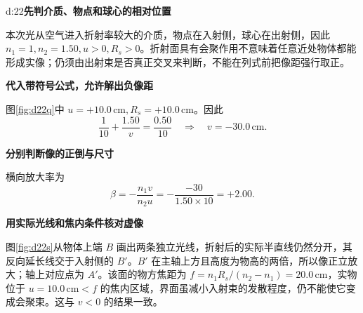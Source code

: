 \begin{drillsolution}{d:22}\textbf{先判介质、物点和球心的相对位置}\par\nobreak
本次光从空气进入折射率较大的介质，物点在入射侧，球心在出射侧，因此 $n_1=1,n_2=1.50,u>0,R_s>0$。折射面具有会聚作用不意味着任意近处物体都能形成实像；仍须由出射束是否真正交叉来判断，不能在列式前把像距强行取正。



\par\medskip{}\noindent\textbf{代入带符号公式，允许解出负像距}\par\nobreak
图\ref{fig:d22q}中 \(u=+10.0\,\mathrm{cm},R_s=+10.0\,\mathrm{cm}\)。因此
\[
 \frac1{10}+\frac{1.50}{v}=\frac{0.50}{10}
 \quad\Rightarrow\quad\boxed{v=-30.0\,\mathrm{cm}}.
\]


\par\medskip{}\noindent\textbf{分别判断像的正倒与尺寸}\par\nobreak
横向放大率为
\[
 \boxed{\beta=-\frac{n_1v}{n_2u}
 =-\frac{-30}{1.50\times10}=+2.00}.
\]


\par\medskip{}\noindent\textbf{用实际光线和焦内条件核对虚像}\par\nobreak
图\ref{fig:d22s}从物体上端 $B$ 画出两条独立光线，折射后的实际半直线仍然分开，其反向延长线交于入射侧的 $B'$。$B'$ 在主轴上方且高度为物高的两倍，所以像正立放大；轴上对应点为 $A'$。该面的物方焦距为 $f=n_1R_s/(n_2-n_1)=20.0\,\mathrm{cm}$，实物位于 $u=10.0\,\mathrm{cm}<f$ 的焦内区域，界面虽减小入射束的发散程度，仍不能使它变成会聚束。这与 $v<0$ 的结果一致。
\end{drillsolution}

